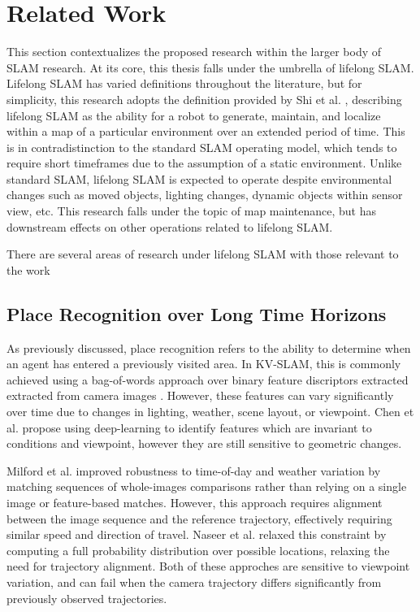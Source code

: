\section{Related Work}
\label{sec:related_work}

This section contextualizes the proposed research within the larger body of SLAM research. At its core, this thesis falls under the umbrella of lifelong SLAM. Lifelong SLAM has varied definitions throughout the literature, but for simplicity, this research adopts the definition provided by Shi et al. \cite{shiAreWeReady2020}, describing lifelong SLAM as the ability for a robot to generate, maintain, and localize within a map of a particular environment over an extended period of time. This is in contradistinction to the standard SLAM operating model, which tends to require short timeframes due to the assumption of a static environment. Unlike standard SLAM, lifelong SLAM is expected to operate despite environmental changes such as moved objects, lighting changes, dynamic objects within sensor view, etc. This research falls under the topic of map maintenance, but has downstream effects on other operations related to lifelong SLAM.

There are several areas of research under lifelong SLAM with those relevant to the work

\subsection{Place Recognition over Long Time Horizons}

As previously discussed, place recognition refers to the ability to determine when an agent has entered a previously visited area. In KV-SLAM, this is commonly achieved using a bag-of-words approach over binary feature discriptors extracted extracted from camera images \cite{camposORBSLAM3AccurateOpenSource2021}. However, these features can vary significantly over time due to changes in lighting, weather, scene layout, or viewpoint. Chen et al. \cite{chenDeepLearningFeatures2017} propose using deep-learning to identify features which are invariant to conditions and viewpoint, however they are still sensitive to geometric changes.

Milford et al. improved robustness to time-of-day and weather variation by matching sequences of whole-images comparisons rather than relying on a single image or feature-based matches. However, this approach requires alignment between the image sequence and the reference trajectory, effectively requiring similar speed and direction of travel. Naseer et al. \cite{naseerVisionbasedMarkovLocalization2015} relaxed this constraint by computing a full probability distribution over possible locations, relaxing the need for trajectory alignment. Both of these approches are sensitive to viewpoint variation, and can fail when the camera trajectory differs significantly from previously observed trajectories.


